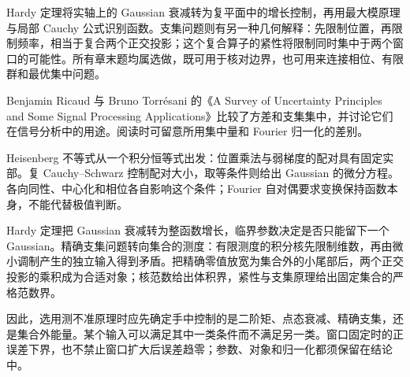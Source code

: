 \ProseParagraphBreak

Hardy 定理将实轴上的 Gaussian 衰减转为复平面中的增长控制，再用最大模原理与局部 Cauchy 公式识别函数。支集问题则有另一种几何解释：先限制位置，再限制频率，相当于复合两个正交投影；这个复合算子的紧性将限制同时集中于两个窗口的可能性。所有章末题均属选做，既可用于核对边界，也可用来连接相位、有限群和最优集中问题。

\ProseParagraphBreak

Benjamin Ricaud 与 Bruno Torrésani 的《A Survey of Uncertainty Principles and Some Signal Processing Applications》\cite[Sections 3.2 and 3.3.2]{Ricaud2013Survey}比较了方差和支集集中，并讨论它们在信号分析中的用途。阅读时可留意所用集中量和 Fourier 归一化的差别。





\begin{chaptersummary}
Heisenberg 不等式从一个积分恒等式出发：位置乘法与弱梯度的配对具有固定实部。复 Cauchy--Schwarz 控制配对大小，取等条件则给出 Gaussian 的微分方程。各向同性、中心化和相位各自影响这个条件；Fourier 自对偶要求变换保持函数本身，不能代替极值判断。

\ProseParagraphBreak

Hardy 定理把 Gaussian 衰减转为整函数增长，临界参数决定是否只能留下一个 Gaussian。精确支集问题转向集合的测度：有限测度的积分核先限制维数，再由微小调制产生的独立输入得到矛盾。把精确零值放宽为集合外的小尾部后，两个正交投影的乘积成为合适对象；核范数给出体积界，紧性与支集原理给出固定集合的严格范数界。

\ProseParagraphBreak

因此，选用测不准原理时应先确定手中控制的是二阶矩、点态衰减、精确支集，还是集合外能量。某个输入可以满足其中一类条件而不满足另一类。窗口固定时的正误差下界，也不禁止窗口扩大后误差趋零；参数、对象和归一化都须保留在结论中。
\end{chaptersummary}

\BookExercises

